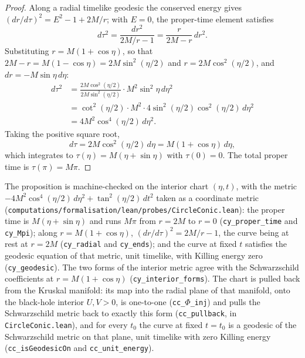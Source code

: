 \documentclass[11pt,a4paper]{article}
\theoremstyle{definition}
\begin{document}
\begin{proof}
Along a radial timelike geodesic the conserved energy gives $(dr/d\tau)^2=E^2-1+2M/r$; with $E=0$, the proper-time element satisfies
\begin{equation}
d\tau^2 = \frac{dr^2}{2M/r - 1} = \frac{r}{2M - r}\, dr^2.
\end{equation}
Substituting $r = M(1+\cos\eta)$, so that $2M - r = M(1 - \cos\eta) = 2M\sin^2(\eta/2)$ and $r = 2M\cos^2(\eta/2)$, and $dr = -M\sin\eta\, d\eta$:
\begin{align}
d\tau^2 &= \frac{2M\cos^2(\eta/2)}{2M\sin^2(\eta/2)} \cdot M^2\sin^2\eta\, d\eta^2 \nonumber\\
&= \cot^2(\eta/2) \cdot M^2 \cdot 4\sin^2(\eta/2)\cos^2(\eta/2)\, d\eta^2 \nonumber\\
&= 4M^2 \cos^4(\eta/2)\, d\eta^2.
\end{align}
Taking the positive square root,
\begin{equation}
d\tau = 2M\cos^2(\eta/2)\, d\eta = M(1 + \cos\eta)\, d\eta,
\end{equation}
which integrates to $\tau(\eta) = M(\eta + \sin\eta)$ with $\tau(0) = 0$. The total proper time is $\tau(\pi) = M\pi$.
\end{proof}

The proposition is machine-checked on the interior chart $(\eta,t)$, with the metric $-4M^{2}\cos^{4}(\eta/2)\,d\eta^{2}+\tan^{2}(\eta/2)\,dt^{2}$ taken as a coordinate metric (\texttt{computations/formalisation/lean/probes/CircleConic.lean}): the proper time is $M(\eta+\sin\eta)$ and runs $M\pi$ from $r=2M$ to $r=0$ (\texttt{cy\_proper\_time} and \texttt{cy\_Mpi}); along $r=M(1+\cos\eta)$, $(dr/d\tau)^{2}=2M/r-1$, the curve being at rest at $r=2M$ (\texttt{cy\_radial} and \texttt{cy\_ends}); and the curve at fixed $t$ satisfies the geodesic equation of that metric, unit timelike, with Killing energy zero (\texttt{cy\_geodesic}). The two forms of the interior metric agree with the Schwarzschild coefficients at $r=M(1+\cos\eta)$ (\texttt{cy\_interior\_forms}). The chart is pulled back from the Kruskal manifold: its map into the radial plane of that manifold, onto the black-hole interior $U,V>0$, is one-to-one (\texttt{cc\_$\Phi$\_inj}) and pulls the Schwarzschild metric back to exactly this form (\texttt{cc\_pullback}, in \texttt{CircleConic.lean}), and for every $t_0$ the curve at fixed $t=t_0$ is a geodesic of the Schwarzschild metric on that plane, unit timelike with zero Killing energy (\texttt{cc\_isGeodesicOn} and \texttt{cc\_unit\_energy}).
\end{document}
